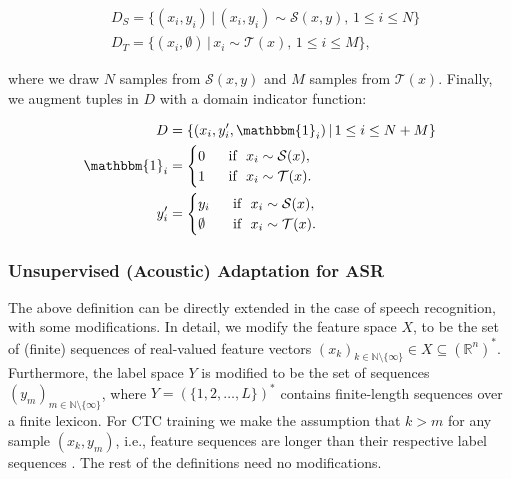 \documentclass[journal]{IEEEtran}
\begin{document}
\begin{equation}\label{eq:train-sets}
\begin{split}
 &	D_S = \{(x_i, y_i) \, |\, (x_i, y_i) \sim \mathcal{S}(x, y) ,\, 1 \leq i \leq N \} \\
 &  D_T =\{(x_i, \emptyset) \, | \, x_i \sim \mathcal{T}(x) , \, 1 \leq i \leq M \},
\end{split}
\end{equation}

where we draw $N$ samples from $\mathcal{S}(x,y)$ and $M$ samples from $\mathcal{T}(x)$. Finally, we augment tuples in $D$ with a domain indicator function:

\begin{equation}
    \begin{split}
    D &= \{(x_i, y'_i, \mathbbm{1}_i) \, | \, 1 \leq i \leq N+M \}\\
    \mathbbm{1}_i &= \begin{cases}
0 ~&\text{ if }~ x_i \sim \mathcal{S}(x), \\
1 ~&\text{ if }~ x_i \sim \mathcal{T}(x).
\end{cases}\\
    y'_i &= \begin{cases}
y_i ~&\text{ if }~ x_i \sim \mathcal{S}(x), \\
\emptyset ~&\text{ if }~ x_i \sim \mathcal{T}(x).
\end{cases}
    \end{split}
\end{equation}

\subsubsection{Unsupervised (Acoustic) Adaptation for ASR}
The above definition can be directly extended in the case of speech recognition, with some modifications. In detail, we modify the feature space $X$, to be the set of (finite) sequences of real-valued feature vectors $(x_k)_{k\in \mathbb{N} \setminus \{\infty\}} \in X \subseteq (\mathbb{R}^n)^*$. Furthermore, the label space $Y$ is modified to be the set of sequences $(y_m)_{m\in \mathbb{N} \setminus \{\infty\}}$, where $Y = (\{1, 2,\dots, L\})^*$ contains finite-length sequences over a finite lexicon. For CTC training we make the assumption that $k>m$ for any sample $(x_k, y_m)$, i.e., feature sequences are longer than their respective label sequences \cite{10.1145/1143844.1143891}.
The rest of the definitions need no modifications.
\end{document}
